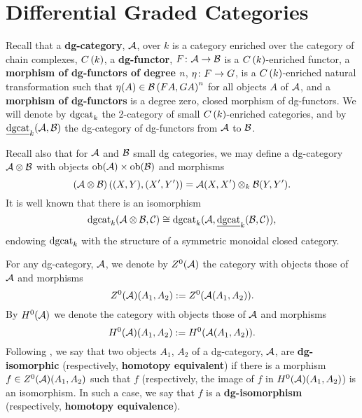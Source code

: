 \chapter{Differential Graded Categories}\label{section: background on dgcats}
Recall that a \textbf{dg-category}, \(\mathcal{A}\), over \(k\) is a category enriched over the category of chain complexes, \(C\left(k\right)\), a \textbf{dg-functor}, \(F \colon \mathcal{A} \rightarrow \mathcal{B}\) is a \(C\left(k\right)\)-enriched functor, a \textbf{morphism of dg-functors of degree \(n\)}, \(\eta \colon F \rightarrow G\), is a \(C\left(k\right)\)-enriched natural transformation such that \(\eta(A) \in \mathcal{B}\left(FA, GA\right)^n\) for all objects \(A\) of \(\mathcal {\mathcal{A}}\), and a \textbf{morphism of dg-functors} is a degree zero, closed morphism of dg-functors.
We will denote by \(\operatorname{dgcat}_k\) the 2-category of small \(C\left(k\right)\)-enriched categories, and by \(\underline{\operatorname{dgcat}}_{k}(\mathcal{A},\mathcal{B})\) the dg-category of dg-functors from \(\mathcal{A}\) to \(\mathcal{B}\).

Recall also that for \(\mathcal{A}\) and \(\mathcal{B}\) small dg categories, we may define a dg-category \(\mathcal{A} \otimes \mathcal{B}\) with objects \(\operatorname{ob}(\mathcal{A}) \times \operatorname{ob}(\mathcal{B})\) and morphisms
\[(\mathcal{A} \otimes \mathcal{B})\left((X,Y), (X^\prime,Y^\prime)\right) = \mathcal{A}(X,X^\prime) \otimes_k \mathcal{B}(Y, Y^\prime).\]
It is well known that there is an isomorphism
\[\operatorname{dgcat}_k(\mathcal{A} \otimes \mathcal{B}, \mathcal{C}) \cong \operatorname{dgcat}_k(\mathcal{A}, \underline{\operatorname{dgcat}}_{k}(\mathcal{B}, \mathcal{C})),\]
endowing \(\operatorname{dgcat}_k\) with the structure of a symmetric monoidal closed category.

For any dg-category, \(\mathcal{A}\), we denote by \(Z^0(\mathcal{A})\) the category with objects those of \(\mathcal{A}\) and morphisms
\[Z^0(\mathcal{A})(A_1, A_2) := Z^0(\mathcal{A}(A_1,A_2)).\]
By \(H^0(\mathcal{A})\) we denote the category with objects those of \(\mathcal{A}\) and morphisms
\[H^0(\mathcal{A})(A_1, A_2) := H^0(\mathcal{A}(A_1,A_2)).\]
Following \parencite{CS15}, we say that two objects \(A_1\), \(A_2\) of a dg-category, \(\mathcal{A}\), are \textbf{dg-isomorphic} (respectively, \textbf{homotopy equivalent}) if there is a morphism \(f \in Z^0(\mathcal{A})(A_1, A_2)\) such that \(f\) (respectively, the image of \(f\) in \(H^0(\mathcal{A})(A_1, A_2)\)) is an isomorphism.
In such a case, we say that \(f\) is a \textbf{dg-isomorphism} (respectively, \textbf{homotopy equivalence}).

